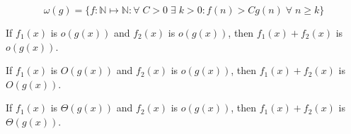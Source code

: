 \begin{definition}
    \[\omega(g)=\{f:\mathbb N\mapsto \mathbb N:\forall\; C>0\;\exists\;k>0:f(n)>Cg(n)\;\forall\;n\geq k\}\]
\end{definition}

\begin{theorem}
    If $f_1(x)$ is $o(g(x))$ and $f_2(x)$ is $o(g(x))$, then $f_1(x)+f_2(x)$ is $o(g(x))$.
\end{theorem}

\begin{theorem}
    If $f_1(x)$ is $O(g(x))$ and $f_2(x)$ is $o(g(x))$, then $f_1(x)+f_2(x)$ is $O(g(x))$.
\end{theorem}

\begin{theorem}
    If $f_1(x)$ is $\Theta(g(x))$ and $f_2(x)$ is $o(g(x))$, then $f_1(x)+f_2(x)$ is $\Theta(g(x))$.
\end{theorem}
